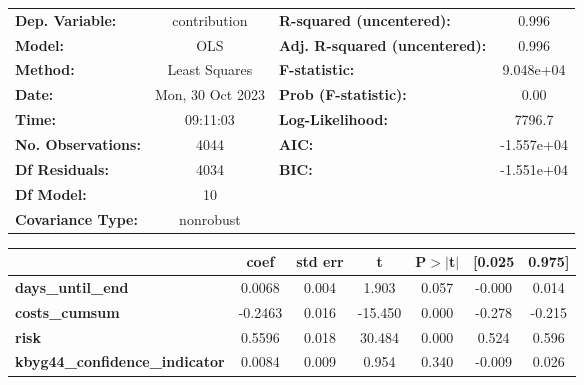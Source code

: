 \begin{center}
\begin{tabular}{lclc}
\toprule
\textbf{Dep. Variable:}                   &   contribution   & \textbf{  R-squared (uncentered):}      &     0.996   \\
\textbf{Model:}                           &       OLS        & \textbf{  Adj. R-squared (uncentered):} &     0.996   \\
\textbf{Method:}                          &  Least Squares   & \textbf{  F-statistic:       }          & 9.048e+04   \\
\textbf{Date:}                            & Mon, 30 Oct 2023 & \textbf{  Prob (F-statistic):}          &     0.00    \\
\textbf{Time:}                            &     09:11:03     & \textbf{  Log-Likelihood:    }          &    7796.7   \\
\textbf{No. Observations:}                &        4044      & \textbf{  AIC:               }          & -1.557e+04  \\
\textbf{Df Residuals:}                    &        4034      & \textbf{  BIC:               }          & -1.551e+04  \\
\textbf{Df Model:}                        &          10      & \textbf{                     }          &             \\
\textbf{Covariance Type:}                 &    nonrobust     & \textbf{                     }          &             \\
\bottomrule
\end{tabular}
\begin{tabular}{lcccccc}
                                          & \textbf{coef} & \textbf{std err} & \textbf{t} & \textbf{P$> |$t$|$} & \textbf{[0.025} & \textbf{0.975]}  \\
\midrule
\textbf{days\_until\_end}                 &       0.0068  &        0.004     &     1.903  &         0.057        &       -0.000    &        0.014     \\
\textbf{costs\_cumsum}                    &      -0.2463  &        0.016     &   -15.450  &         0.000        &       -0.278    &       -0.215     \\
\textbf{risk}                             &       0.5596  &        0.018     &    30.484  &         0.000        &        0.524    &        0.596     \\
\textbf{kbyg44\_confidence\_indicator}    &       0.0084  &        0.009     &     0.954  &         0.340        &       -0.009    &        0.026     \\

\end{tabular}
\end{center}
